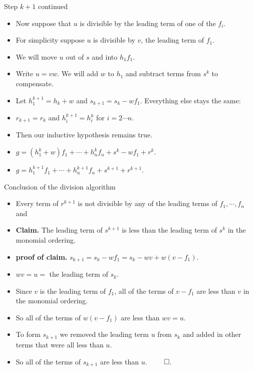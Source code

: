 \documentclass[handout]{beamer}
\begin{document}
\begin{frame}{Step $k+1$ continued}

\begin{itemize}
  \item Now suppose that $u$ is divisible by the leading term of one of the $f_i$.
  \item For simplicity suppose $u$ is divisible by $v$, the leading term of $f_1$.
  \item We will move $u$ out of $s$ and into $h_1 f_1$.
  \item Write $u = vw$. We will add $w$ to $h_1$ and subtract terms from $s^k$ to compensate.
  \item Let $h_1^{k+1} = h_k + w$ and $s_{k+1} = s_k - wf_1$. Everything else stays the same:
  \item $r_{k+1} = r_k$ and $h_i^{k+1} = h_i^k$ for $i = 2\cdots n$.
  \item Then our inductive hypothesis remains true.
  \item $g = (h_1^k + w) f_1 + \cdots + h_n^k f_n + s^k - wf_1 + r^k$.
  \item $g = h_1^{k+1} f_1 + \cdots + h_n^{k+1} f_n + s^{k+1} + r^{k+1}$.
\end{itemize}

\end{frame}

\begin{frame}{Conclusion of the division algorithm}

\begin{itemize}
  \item  Every term of $r^{k+1}$ is not divisible by any of the leading terms of $f_1,\cdots, f_n$ and
  \item \textbf{Claim.} The leading term of $s^{k+1}$ is less than the leading term of $s^k$ in the monomial ordering.
  \item \textbf{proof of claim.}  $s_{k+1} = s_k - wf_1 = s_k - wv + w(v - f_1)$.
  \item $wv = u = $ the leading term of $s_k$.
  \item Since $v$ is the leading term of $f_1$, all of the terms of $v -f_1$ are less than $v$ in the monomial ordering.
  \item So all of the terms of $w(v-f_1)$ are less than $wv = u$.
  \item To form $s_{k+1}$ we removed the leading term $u$ from $s_k$ and added in other terms that were all less than $u$.
  \item So all of the terms of $s_{k+1}$ are less than $u$. $\qed$.
\end{itemize}
\end{frame}
\end{document}
